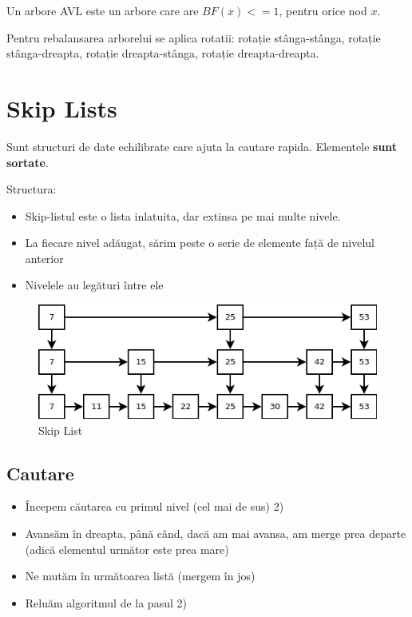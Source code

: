 \documentclass[11pt,a4paper]{article}
\theoremstyle{definition}
\theoremstyle{plain}
\theoremstyle{remark}
\begin{document}
Un arbore AVL este un arbore care are $BF(x) <= 1$, pentru orice nod $x$.

Pentru rebalansarea arborelui se aplica rotatii: rotație stânga-stânga, rotație stânga-dreapta, rotație dreapta-stânga, rotație dreapta-dreapta.

\section{Skip Lists}
Sunt structuri de date echilibrate care ajuta la cautare rapida. Elementele \textbf{sunt sortate}.

Structura:
\begin{itemize}
    \item Skip-listul este o lista inlatuita, dar extinsa pe mai multe nivele.
    \item La ﬁecare nivel adăugat, sărim peste o serie de elemente față de nivelul anterior
    \item Nivelele au legături între ele
\end{itemize}

\begin{figure}[H]
    \centering
    \includegraphics[width=0.75\linewidth]{skip-lists.png}
    \caption{Skip List}
    \label{fig:enter-label}
\end{figure}

\subsection*{Cautare}

\begin{itemize}
    \item Începem căutarea cu primul nivel (cel mai de sus) 2)
    \item Avansăm în dreapta, până când, dacă am mai avansa, am merge prea departe (adică elementul următor este prea mare)
    \item Ne mutăm în următoarea listă (mergem în jos)
    \item Reluăm algoritmul de la pasul 2)
    
\end{itemize}
\end{document}
